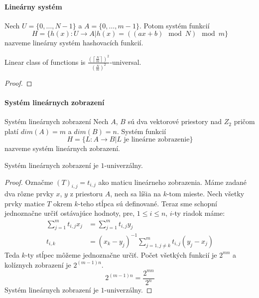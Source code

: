 \paragraph{Lineárny systém}
\begin{definition}
Nech $U = \{0, \dots, N - 1 \}$ a $A = \{0, \dots, m - 1\}$. Potom systém funkcií 
\[ H = \{h(x): U \rightarrow A | h(x) = ((ax + b) \mod N) \mod m\} \]
nazveme lineárny systém hashovacích funkcií.
\end{definition}

\begin{remark}
Linear class of functions is $\frac{\left(\left\lceil \frac{N}{m} \right\rceil\right)^2}{\left(\frac{N}{m}\right)^2}$-universal.
\end{remark}
\begin{proof}
\end{proof}

\paragraph{Systém lineárnych zobrazení}
\begin{definition}{Systém lineárnych zobrazení}
Nech $A$, $B$ sú dva vektorové priestory nad $Z_2$ pričom platí $dim(A) = m$ a $dim(B) = n$. Systém funkcií 
\begin{displaymath}
H = \{L : A \rightarrow B | L \text{ je lineárne zobrazenie}\}
\end{displaymath}
nazveme systém lineárnych zobrazení.
\end{definition}
\begin{remark}
Systém lineárnych zobrazení je $1$-univerzálny.
\end{remark}
\begin{proof}
Označme $(T)_{i, j}=t_{i, j}$ ako maticu lineárneho zobrazenia. Máme zadané dva rôzne prvky $x$, $y$ z priestoru $A$, nech sa líšia na $k$-tom mieste. Nech všetky prvky matice $T$ okrem $k$-teho stĺpca sú definované. Teraz sme schopní jednoznačne určiť ostávajúce hodnoty, pre, $1 \leq i \leq n$, $i$-ty riadok máme:
\begin{displaymath}
\begin{split}
\displaystyle\sum_{j = 1}^{m}t_{i, j}x_j & = \displaystyle\sum_{j = 1}^{m}t_{i, j}y_j \\
t_{i, k} & = (x_k - y_j)^{-1}\displaystyle\sum_{j = 1, j \neq k}^{m}t_{i, j}(y_j - x_j)
\end{split}
\end{displaymath}
Teda $k$-ty stĺpec môžeme jednoznačne určiť. Počet všetkých funkcií je $2^{mn}$ a kolíznych zobrazení je $2^{(m-1)n}$.
\begin{displaymath}
2^{(m-1)n} = \frac{2^{mn}}{2^n}
\end{displaymath}
Systém lineárnych zobrazení je $1$-univerzálny.
\end{proof}

